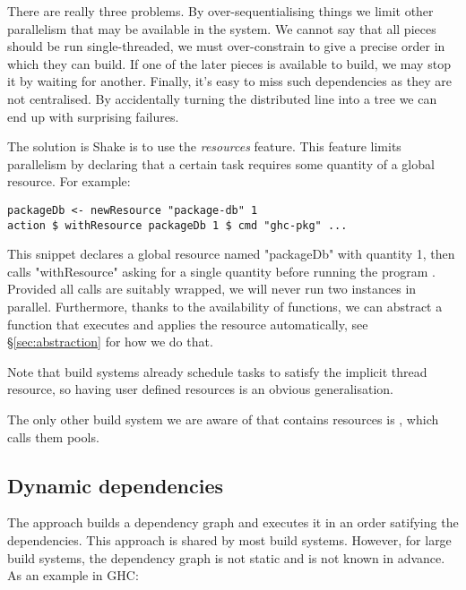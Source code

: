 There are really three problems. By over-sequentialising things we limit other
parallelism that may be available in the system. We cannot say that all pieces
should be run single-threaded, we must over-constrain to give a precise order in
which they can build. If one of the later pieces is available to build, we may
stop it by waiting for another. Finally, it's easy to miss such dependencies as
they are not centralised. By accidentally turning the distributed line into a
tree we can end up with surprising failures.

The solution is Shake is to use the \emph{resources} feature. This feature limits parallelism by declaring that a certain task requires some quantity of a global resource. For example:

\begin{lstlisting}[basicstyle=\ttfamily]
packageDb <- newResource "package-db" 1
action $ withResource packageDb 1 $ cmd "ghc-pkg" ...
\end{lstlisting}

This snippet declares a global resource named \lst"packageDb" with quantity 1,
then calls \lst"withResource" asking for a single quantity before running the
program . Provided all  calls are suitably wrapped,
we will never run two instances in parallel. Furthermore, thanks to the
availability of functions, we can abstract a function that executes
 and applies the resource automatically, see
\S\ref{sec:abstraction} for how we do that.

Note that build systems already schedule tasks to satisfy the implicit thread
resource, so having user defined resources is an obvious generalisation.

The only other build system we are aware of that contains resources is
, which calls them pools.

\subsection{Dynamic dependencies}

The \make{} approach builds a dependency graph and executes it in an order satifying the dependencies. This approach is shared by most build systems. However, for large build systems, the dependency graph is not static and is not known in advance. As an example in GHC:

